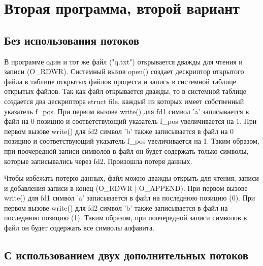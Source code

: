 \clearpage

\section{Вторая программа, второй вариант}

\subsection{Без использования потоков}


\clearpage


В программе один и тот же файл ("q.txt") открывается дважды для чтения и записи (O\_RDWR).
Системный вызов open() создает дескриптор открытого файла в таблице открытых файлов процесса и запись в системной таблице открытых файлов.
Так как файл открывается дважды, то в системной таблице создается два дескриптора struct file, каждый из которых имеет собственный указатель f\_pos.
При первом вызове write() для fd1 символ 'a' записывается в файл на 0 позицию и соответствующий указатель f\_pos увеличивается на 1.
При первом вызове write() для fd2 символ 'b' также записывается в файл на 0 позицию и соответствующий указатель f\_pos увеличивается на 1.
Таким образом, при поочередной записи символов в файл он будет содержать только символы, которые записывались через fd2.
Произошла потеря данных.

Чтобы избежать потерю данных, файл можно дважды открыть для чтения, записи и добавления записи в конец (O\_RDWR | O\_APPEND).
При первом вызове write() для fd1 символ 'a' записывается в файл на последнюю позицию (0).
При первом вызове write() для fd2 символ 'b' также записывается в файл на последнюю позицию (1).
Таким образом, при поочередной записи символов в файл он будет содержать все символы алфавита.

\clearpage

\subsection{С использованием двух дополнительных потоков}



